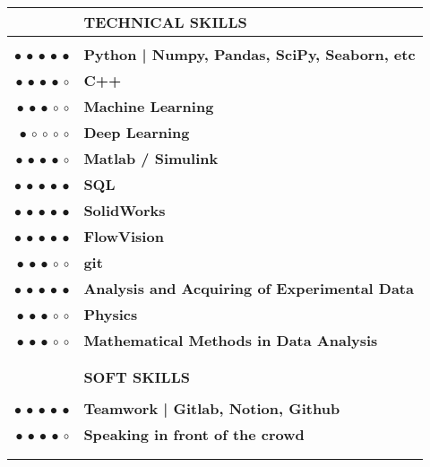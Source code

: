 \documentclass[11pt]{article}
\newcommand{\largespace}{\\[2pt]}
\newcommand{\mediumspace}{\\[-3pt]}
\newcommand{\titlefont}[1]{\uppercase{\textbf{\Large{#1}}}}
\begin{document}
\begin{tcbposter}[
    poster = {columns=1, rows=1, spacing=0pt},
    boxes = {sharp corners, halign=center, valign=center, boxrule=0pt}
]
{\begin{tabular}{>{\footnotesize}rl}
        & \titlefont{Technical Skills} \\
        \hline \mediumspace
        $\bullet$ $\bullet$ $\bullet$ $\bullet$ $\bullet$
            & \textbf{Python | Numpy, Pandas, SciPy, Seaborn, etc} \\
        $\bullet$ $\bullet$ $\bullet$ $\bullet$ $\circ$
            & \textbf{C++} \\
        $\bullet$ $\bullet$ $\bullet$ $\circ$ $\circ$
            & \textbf{Machine Learning} \\
        $\bullet$ $\circ$ $\circ$ $\circ$ $\circ$
            & \textbf{Deep Learning} \\
        $\bullet$ $\bullet$ $\bullet$ $\bullet$ $\circ$
            & \textbf{Matlab / Simulink} \\
        $\bullet$ $\bullet$ $\bullet$ $\bullet$ $\bullet$
            & \textbf{SQL} \\
        $\bullet$ $\bullet$ $\bullet$ $\bullet$ $\bullet$
            & \textbf{SolidWorks} \\
        $\bullet$ $\bullet$ $\bullet$ $\bullet$ $\bullet$
            & \textbf{FlowVision} \\
        $\bullet$ $\bullet$ $\bullet$ $\circ$ $\circ$
            & \textbf{git} \\
        $\bullet$ $\bullet$ $\bullet$ $\bullet$ $\bullet$
            & \textbf{Analysis and Acquiring of Experimental Data} \\
        $\bullet$ $\bullet$ $\bullet$ $\circ$ $\circ$
            & \textbf{Physics} \\
        $\bullet$ $\bullet$ $\bullet$ $\circ$ $\circ$
            & \textbf{Mathematical Methods in Data Analysis} \\
            & \\
            & \largespace
        & \titlefont{Soft Skills} \\
        \hline \mediumspace

        $\bullet$ $\bullet$ $\bullet$ $\bullet$ $\bullet$
            & \textbf{Teamwork | Gitlab, Notion, Github} \\
        $\bullet$ $\bullet$ $\bullet$ $\bullet$ $\circ$
            & \textbf{Speaking in front of the crowd} \\
            & \\
            & \largespace


\end{tabular}}
\end{tcbposter}
\end{document}
